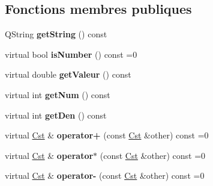 \subsection*{Fonctions membres publiques}
\begin{DoxyCompactItemize}
\item 
\hypertarget{classcalcul_1_1_cst_aad9a62f89cf706a578e8c91f8a3e5ee4}{Q\-String {\bfseries get\-String} () const }\label{classcalcul_1_1_cst_aad9a62f89cf706a578e8c91f8a3e5ee4}

\item 
\hypertarget{classcalcul_1_1_cst_ae38302c6557f87441ba299bc04a3845d}{virtual bool {\bfseries is\-Number} () const =0}\label{classcalcul_1_1_cst_ae38302c6557f87441ba299bc04a3845d}

\item 
\hypertarget{classcalcul_1_1_cst_ac0c0bee65b80528f5b97a3ab12baeff5}{virtual double {\bfseries get\-Valeur} () const }\label{classcalcul_1_1_cst_ac0c0bee65b80528f5b97a3ab12baeff5}

\item 
\hypertarget{classcalcul_1_1_cst_a1047aa48fd66af061463464989c9fab8}{virtual int {\bfseries get\-Num} () const }\label{classcalcul_1_1_cst_a1047aa48fd66af061463464989c9fab8}

\item 
\hypertarget{classcalcul_1_1_cst_ae97edda2c50631d45e448fa16ab9fe86}{virtual int {\bfseries get\-Den} () const }\label{classcalcul_1_1_cst_ae97edda2c50631d45e448fa16ab9fe86}

\item 
\hypertarget{classcalcul_1_1_cst_aa81b86f1f4c1206d653ec3ad3733a9ab}{virtual \hyperlink{classcalcul_1_1_cst}{Cst} \& {\bfseries operator+} (const \hyperlink{classcalcul_1_1_cst}{Cst} \&other) const =0}\label{classcalcul_1_1_cst_aa81b86f1f4c1206d653ec3ad3733a9ab}

\item 
\hypertarget{classcalcul_1_1_cst_a141745da396751c6a2ff012774fa1e74}{virtual \hyperlink{classcalcul_1_1_cst}{Cst} \& {\bfseries operator$\ast$} (const \hyperlink{classcalcul_1_1_cst}{Cst} \&other) const =0}\label{classcalcul_1_1_cst_a141745da396751c6a2ff012774fa1e74}

\item 
\hypertarget{classcalcul_1_1_cst_a4451f0f4ce0e47ee7ee1ae6c8634065f}{virtual \hyperlink{classcalcul_1_1_cst}{Cst} \& {\bfseries operator-\/} (const \hyperlink{classcalcul_1_1_cst}{Cst} \&other) const =0}\label{classcalcul_1_1_cst_a4451f0f4ce0e47ee7ee1ae6c8634065f}


\end{DoxyCompactItemize}
